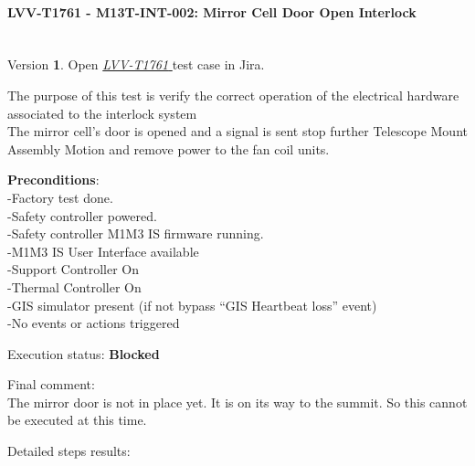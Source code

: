 \documentclass[SE,lsstdraft,STR,toc]{lsstdoc}
\begin{document}
\paragraph{ LVV-T1761 - M13T-INT-002: Mirror Cell Door Open Interlock }\mbox{}\\

Version \textbf{1}.
Open  \href{https://jira.lsstcorp.org/secure/Tests.jspa#/testCase/LVV-T1761}{\textit{ LVV-T1761 } }
test case in Jira.

The purpose of this test is verify the correct operation of the
electrical hardware associated to the interlock system\\
The mirror cell's door is opened and a signal is sent stop further
Telescope Mount Assembly Motion and remove power to the fan coil units.

\textbf{ Preconditions}:\\
-Factory test done.\\
-Safety controller powered.\\
-Safety controller M1M3 IS firmware running.\\
-M1M3 IS User Interface available\\
-Support Controller On\\
-Thermal Controller On\\
-GIS simulator present (if not bypass ``GIS Heartbeat loss'' event)\\
-No events or actions triggered

Execution status: {\bf Blocked }

Final comment:\\The mirror door is not in place yet. It is on its way to the summit. So
this cannot be executed at this time.


Detailed steps results:
\end{document}
